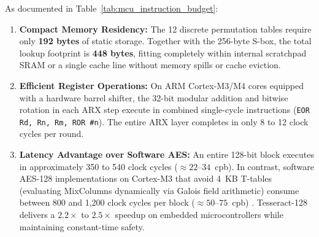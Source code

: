 \documentclass[review,12pt]{elsarticle}
\begin{document}
\begin{table}[htbp]
\caption{Assembly instruction budget and estimated clock cycle consumption per round of Tesseract-128 on 32-bit embedded architectures (ARM Thumb-2 Cortex-M3/M4 and RISC-V RV32I).}
\label{tab:mcu_instruction_budget}
\centering
\small
{}
\end{table}

As documented in Table~\ref{tab:mcu_instruction_budget}:
\begin{enumerate}
    \item \textbf{Compact Memory Residency:} The 12 discrete permutation tables require only \textbf{192 bytes} of static storage. Together with the 256-byte S-box, the total lookup footprint is \textbf{448 bytes}, fitting completely within internal scratchpad SRAM or a single cache line without memory spills or cache eviction.
    \item \textbf{Efficient Register Operations:} On ARM Cortex-M3/M4 cores equipped with a hardware barrel shifter, the 32-bit modular addition and bitwise rotation in each ARX step execute in combined single-cycle instructions (\texttt{EOR Rd, Rn, Rm, ROR \#n}). The entire ARX layer completes in only 8 to 12 clock cycles per round.
    \item \textbf{Latency Advantage over Software AES:} An entire 128-bit block executes in approximately 350 to 540 clock cycles ($\approx 22$--$34$~cpb). In contrast, software AES-128 implementations on Cortex-M3 that avoid 4~KB T-tables (evaluating MixColumns dynamically via Galois field arithmetic) consume between 800 and 1,200 clock cycles per block ($\approx 50$--$75$~cpb) \cite{kaartinen2009comparative}. Tesseract-128 delivers a $2.2\times$ to $2.5\times$ speedup on embedded microcontrollers while maintaining constant-time safety.
\end{enumerate}
\end{document}
